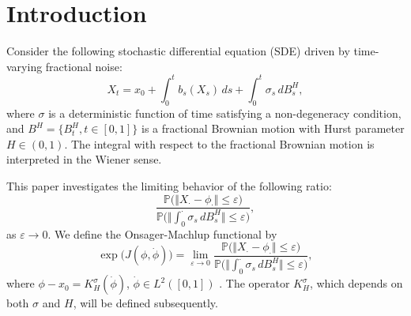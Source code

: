 \documentclass[preprint,12pt]{elsarticle}
\theoremstyle{definition}  %
\theoremstyle{plain}  %
\begin{document}
\allowdisplaybreaks


\section{Introduction}
 Consider the following stochastic differential equation (SDE) driven by time-varying fractional noise:
\begin{equation}
    X_t = x_0 + \int_0^t b_s(X_s)\,ds + \int_0^t \sigma_s\,dB^H_s, \label{fir}
\end{equation}
where $\sigma$ is a deterministic function of time satisfying a non-degeneracy condition, and $B^H = \{B^H_t, t \in [0,1]\}$ is a fractional Brownian motion with Hurst parameter $H \in (0,1)$. 
The integral with respect to the fractional Brownian motion is interpreted in the Wiener sense.

This paper investigates the limiting behavior of the following ratio:
\begin{equation*}
    \frac{\mathbb{P}\big(\Vert X_\cdot - \phi_\cdot \Vert \leq \varepsilon\big)}{\mathbb{P}\big(\Vert \textstyle{\int_0^\cdot} \sigma_s\,dB^H_s \Vert \leq \varepsilon\big)},
\end{equation*}
as $\varepsilon \to 0$. We define the Onsager-Machlup functional by
\begin{equation}
    \exp\big(J(\phi,\dot{\phi})\big) = \lim_{\varepsilon \to 0} \frac{\mathbb{P}\big(\Vert X_\cdot - \phi_\cdot \Vert \leq \varepsilon\big)}{\mathbb{P}\big(\Vert \textstyle{\int_0^\cdot} \sigma_s\,dB^H_s \Vert \leq \varepsilon\big)},\label{omfunctional}
\end{equation}
where $\phi - x_0=K_H^\sigma(\dot{\phi})$, $ \dot{\phi}\in L^2([0,1])$ . The operator $K_H^\sigma$, which depends on both $\sigma$ and $H$, will be defined subsequently.
\end{document}

